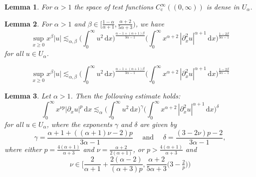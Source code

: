 \documentclass[10pt,a4paper]{amsart}
\newtheorem{lemma}{Lemma}
\renewcommand{\d}{\ensuremath{\mathrm{d}}}
\begin{document}
\begin{lemma}\label{lem-approx-ualpha}
For $\alpha > 1$ the space of test functions $C_\mathrm{c}^\infty((0,\infty))$ is dense in $U_\alpha$.
\end{lemma}

\begin{lemma}\label{lem:weight xu}
For \(\alpha >1\) and \(\beta \in \big[\frac{1-\alpha}{\alpha +1}, \frac{\alpha+2}{5\alpha +3}\big)\),
%
we have
%
\begin{equation}\label{eq:weight xu}
\sup_{x \ge 0} x^\beta |u| \lesssim_{\alpha,\beta} \Big(\int_0^\infty u^2 \, \d x\Big)^{\frac{\alpha -1 + (\alpha +1)\beta}{3\alpha -1}} \Big(\int_0^\infty x^{\alpha+2} \, |\partial_x^2 u|^{\alpha+1} \, \d x\Big)^{\frac{1-2\beta}{3\alpha -1}}
\end{equation}
%
for all $u \in U_\alpha$.
\end{lemma}

\begin{equation}
\sup_{x \ge 0} x^\beta |u| \lesssim_{\alpha,\beta} \Big(\int_0^\infty u^2 \, \d x\Big)^{\frac{\alpha -1 + (\alpha +1)\beta}{3\alpha -1}} \Big(\int_0^\infty x^{\alpha+2} \, |\partial_x^2 u|^{\alpha+1} \, \d x\Big)^{\frac{1-2\beta}{3\alpha -1}}
\end{equation}

\begin{lemma}\label{lem:weight xu lp'}
%
Let $\alpha >1$. Then the following estimate holds:
%
 \begin{equation}\label{eq:weight xu lp'}
\int_0^\infty x^{\nu p} |\partial _x u|^p \, \d x \lesssim_\alpha \Big(\int_0^\infty u^2 \, \d x\Big)^\gamma \Big(\int_0^\infty x^{\alpha+2} \, |\partial_x^2 u|^{\alpha+1} \, \d x\Big)^\delta
 \end{equation}
%
 for all $u \in U_\alpha$, where the exponents $\gamma$ and $\delta$ are given by
 \begin{equation*}
     \gamma = \frac{\alpha+1+((\alpha+1)\nu - 2) p}{3\alpha -1} \quad \text{ and } \quad \delta= \frac{(3-2\nu) p - 2}{3\alpha -1},
 \end{equation*}
where either $p = \frac{4(\alpha+1)}{\alpha+3}$ and $\nu = \frac{\alpha+2}{2(\alpha+1)}$, or $p>\frac{4(\alpha+1)}
%
{\alpha+3}$ and 
%
 \begin{equation*}
\nu \in \Big[\frac{2}{\alpha +1} + \frac{2(\alpha-2)}{(\alpha +3) p}, \frac{\alpha +2}{5\alpha +3} \big(3 - \tfrac 2 p \big)\Big) 
\end{equation*}
%
\end{lemma}
\end{document}
